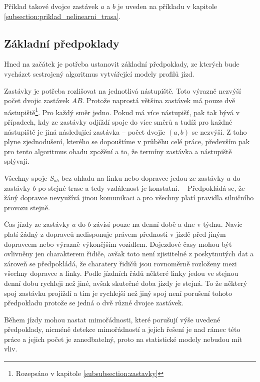 \bigbreak

Příklad takové dvojce zastávek $a$ a $b$ je uveden na příkladu v kapitole \ref{subsection:priklad_nelinearni_trasa}.

\subsection{Základní předpoklady} \label{section:zakladni_predpoklady}

Hned na začátek je potřeba ustanovit základní předpoklady, ze kterých bude vycházet sestrojený algoritmus vytvářející modely profilů jízd.

\bigbreak

Zastávky je potřeba rozlišovat na jednotlivá nástupiště. Toto výrazně nezvýší počet dvojic zastávek $AB$. Protože naprostá většina zastávek má pouze dvě nástupiště\footnote{Rozepsáno v kapitole \ref{subsubsection:zastavky}}. Pro každý směr jedno. Pokud má více nástupišť, pak tak bývá v případech, kdy ze zastávky odjíždí spoje do více směrů a tudíž pro každné nástupiště je jiná následující zastávka -- počet dvojic $(a, b)$ se nezvýší. Z toho plyne zjednodušení, kterého se dopouštíme v průběhu celé práce, především pak pro tento algoritmus ohadu zpožění a to, že termíny zastávka a nástupiště splývají.

\bigbreak

Všechny spoje $S_{ab}$ bez ohladu na linku nebo dopravce jedou ze zastávky $a$ do zastávky $b$ po stejné trase a tedy vzdálenost je konstatní. -- Předpokládá se, že žáný dopravce nevyužívá jinou komunikaci a pro všechny platí pravidla silničního provozu stejně.

\bigbreak

Čas jízdy ze zastávky $a$ do $b$ závisí pouze na denní době a dne v týdnu. Navíc platí žádný z dopravců nedisponuje právem přednosti v jízdě před jiným dopravcem nebo výrazně výkonějším vozidlem.  Dojezdové časy mohou být ovlivněny jen charakterem řidiče, avšak toto není zjistitelné z poskytnutých dat a zároveň se předpokládá, že charatery řidičů jsou rovnoměrně rozloženy mezi všechny dopravce a linky. Podle jízdních řádů některé linky jedou ve stejnou denní dobu rychleji než jiné, avšak skutečné doba jízdy je stejná. To že některý spoj zastávku projíždí a tím je rychlejší než jiný spoj není porušení tohoto předpokladu protože se jedná o dvě různé dvojce zastávek.

\bigbreak

Během jízdy mohou nastat mimořádnosti, které porušují výše uvedené předpoklady, nicméně detekce mimořádností a jejich řešení je nad rámec této práce a jejich počet je zanedbatelný, proto na statistické modely nebudou mít vliv.

